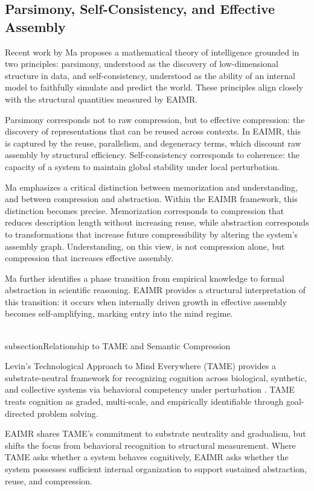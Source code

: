 \documentclass[11pt,letterpaper]{article}
\begin{document}
\subsection{Parsimony, Self-Consistency, and Effective Assembly}

Recent work by Ma proposes a mathematical theory of intelligence grounded 
in two principles: parsimony, understood as the discovery of low-dimensional 
structure in data, and self-consistency, understood as the ability of an 
internal model to faithfully simulate and predict the world. These principles 
align closely with the structural quantities measured by EAIMR.

Parsimony corresponds not to raw compression, but to effective compression: 
the discovery of representations that can be reused across contexts. In 
EAIMR, this is captured by the reuse, parallelism, and degeneracy terms, 
which discount raw assembly by structural efficiency. Self-consistency 
corresponds to coherence: the capacity of a system to maintain global 
stability under local perturbation.

Ma emphasizes a critical distinction between memorization and understanding, 
and between compression and abstraction. Within the EAIMR framework, this 
distinction becomes precise. Memorization corresponds to compression that 
reduces description length without increasing reuse, while abstraction 
corresponds to transformations that increase future compressibility by 
altering the system’s assembly graph. Understanding, on this view, is not 
compression alone, but compression that increases effective assembly.

Ma further identifies a phase transition from empirical knowledge to 
formal abstraction in scientific reasoning. EAIMR provides a structural 
interpretation of this transition: it occurs when internally driven growth 
in effective assembly becomes self-amplifying, marking entry into the 
mind regime.

\\subsection{Relationship to TAME and Semantic Compression}

Levin’s Technological Approach to Mind Everywhere (TAME) provides a 
substrate-neutral framework for recognizing cognition across biological, 
synthetic, and collective systems via behavioral competency under perturbation 
\cite{levin2022}. TAME treats cognition as graded, multi-scale, and empirically 
identifiable through goal-directed problem solving.

EAIMR shares TAME’s commitment to substrate neutrality and gradualism, but shifts 
the focus from behavioral recognition to structural measurement. Where TAME 
asks whether a system behaves cognitively, EAIMR asks whether the system 
possesses sufficient internal organization to support sustained abstraction, 
reuse, and compression.
\end{document}
